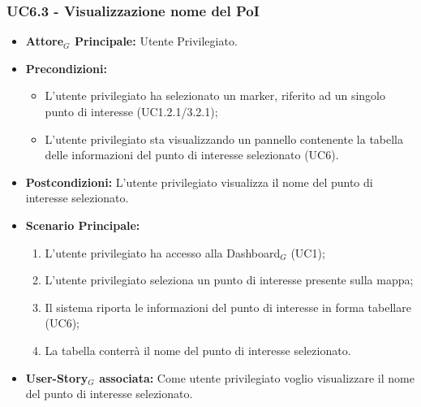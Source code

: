 \documentclass[11pt]{article}
\begin{document}
\begin{justify}
 \subsubsection{\textbf{UC6.3 - Visualizzazione nome del PoI}}
 \begin{itemize}
     \item \textbf{Attore$_G$ Principale:} Utente Privilegiato.
     \item \textbf{Precondizioni:}
       \begin{itemize}
    	        \item L'utente privilegiato ha selezionato un marker, riferito ad un singolo punto di interesse (UC1.2.1/3.2.1);
          \item L'utente privilegiato sta visualizzando un pannello contenente la tabella delle informazioni del punto di interesse selezionato (UC6).
       \end{itemize}
     \item \textbf{Postcondizioni:} L'utente privilegiato visualizza il nome del punto di interesse selezionato.
     \item \textbf{Scenario Principale:}
        \begin{enumerate}
            \item L'utente privilegiato ha accesso alla Dashboard$_G$ (UC1);
            \item L'utente privilegiato seleziona un punto di interesse presente sulla mappa;
            \item Il sistema riporta le informazioni del punto di interesse in forma tabellare (UC6);
            \item La tabella conterrà il nome del punto di interesse selezionato.
        \end{enumerate}
     \item \textbf{User-Story$_G$ associata:} Come utente privilegiato voglio visualizzare il nome del punto di interesse selezionato. 
 \end{itemize}

\end{justify}
\end{document}
